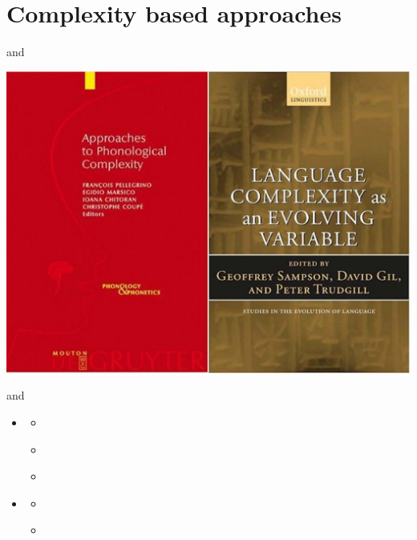\documentclass[
  ignorenonframetext,
]{beamer}
\providecommand{\tightlist}{%
  \setlength{\itemsep}{0pt}\setlength{\parskip}{0pt}}
\begin{document}
\hypertarget{complexity-based-approaches}{%
\section{Complexity based
approaches}\label{complexity-based-approaches}}

\begin{frame}{\citep{pellegrino09} and \citep{sampson09}}
\protect\hypertarget{pellegrino09-and-sampson09}{}
\begin{center}\includegraphics[width=16.75in]{images/complexity} \end{center}
\end{frame}

\begin{frame}{\citep{pellegrino09} and \citep{sampson09}}
\protect\hypertarget{pellegrino09-and-sampson09-1}{}
\begin{itemize}
\tightlist
\item
  \citep{pellegrino09}

  \begin{itemize}
  \tightlist
  \item
    \citep{ohala09}
  \item
    \citep{maddieson09}
  \item
    \citep{coupe09}
  \end{itemize}
\item
  \citep{sampson09}

  \begin{itemize}
  \tightlist
  \item
    \citep{nichols09}
  \item
    \citep{deutscher09}
  \end{itemize}
\end{itemize}
\end{frame}
\end{document}
